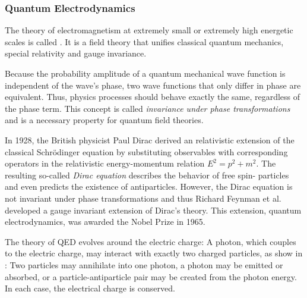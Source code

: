 \subsubsection{Quantum Electrodynamics}
The theory of electromagnetism at extremely small or extremely high energetic scales is called . It is a field theory that unifies classical quantum mechanics, special relativity and gauge invariance.

Because the probability amplitude of a quantum mechanical wave function is independent of the wave's phase, two wave functions that only differ in phase are equivalent. Thus, physics processes should behave exactly the same, regardless of the phase term. This concept is called \emph{invariance under phase transformations} and is a necessary property for quantum field theories.

In 1928, the British physicist Paul Dirac derived an relativistic extension of the classical Schrödinger equation\cite{Dirac:quantumtheoryelectron} by substituting observables with corresponding operators in the relativistic energy-momentum relation $E^2 = p^2 + m^2$. The resulting so-called \emph{Dirac equation} describes the behavior of free spin- particles and even predicts the existence of antiparticles.
However, the Dirac equation is not invariant under phase transformations and thus Richard Feynman et al. developed a gauge invariant extension of Dirac's theory\cite{Feynman:Spacetimeapproach}. This extension, quantum electrodynamics, was awarded the Nobel Prize in 1965\cite{NobelMedia:NobelPrize1965}.

The theory of \ac{QED} evolves around the electric charge: A photon, which couples to the electric charge, may interact with exactly two charged particles, as show in : Two particles may annihilate into one photon, a photon may be emitted or absorbed, or a particle-antiparticle pair may be created from the photon energy. In each case, the electrical charge is conserved.

